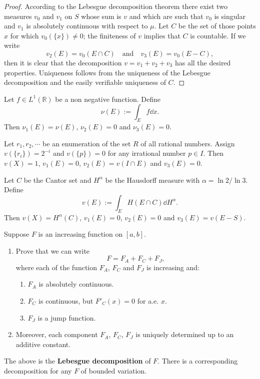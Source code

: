 \begin{proof}
  According to the Lebesgue decomposition theorem there exist two measures $v_0$ and $v_1$ on $S$ 
  whose sum is $v$ and which are such that $v_0$ is singular 
  and $v_1$ is absolutely continuous with respect to $\mu$.
  Let $C$ be the set of those points $x$ for which $v_0(\{x\}) \neq 0$; the finiteness of $v$ implies that 
  $C$ is countable. If we write 
  \[
  v_2(E) = v_0(E\cap C) \quad \text{and}\quad v_3(E) = v_0(E-C),
  \]
  then it is clear that the decomposition $v = v_1 + v_2 + v_3$ has all the desired properties.
  Uniqueness follows from the uniqueness of the Lebesgue decomposition 
  and the easily verifiable uniqueness of $C$.
\end{proof}

\begin{example}
  Let $f\in L^1(\mathbb R)$ be a non negative function. 
  Define 
  \[
  \nu(E) := \int_Ef\dd x.
  \]
  Then $\nu_1(E) = \nu(E)$, $\nu_2(E) = 0$ and $\nu_3(E) = 0$.

  Let $r_1, r_2, \cdots$ be an enumeration of the set $R$ of all rational numbers. 
  Assign $v(\{r_i\}) = 2^{-i}$ and $v(\{p\}) = 0$ for any irrational number $p\in I$.
  Then $v(X) = 1$, $v_1(E) = 0$, $v_2(E) = v(I\cap E)$ and $v_3(E) = 0$.

  Let $C$ be the Cantor set and $H^{\alpha}$ be the Hausdorff measure with $\alpha=\ln 2/\ln3$.
  Define 
  \[
  v(E) := \int_E H(E\cap C)\dd H^\alpha.
  \]
  Then $v(X) = H^\alpha(C)$, $v_1(E) = 0$, $v_2(E) = 0$ and $v_3(E) = v(E-S)$.
\end{example}

\begin{example}
  \label{eg: Lebesgue decomposition of increasing function}
  Suppose $F$ is an increasing function on $[a,b]$.
  \begin{enumerate}
    \item Prove that we can write 
    \[
    F = F_A + F_C + F_J,
    \]
    where each of the function $F_A$, $F_C$ and $F_J$ is increasing and:
    \begin{enumerate}
      \item $F_A$ is absolutely continuous.
      \item $F_C$ is continuous, but $F'_C(x) = 0$ for a.e. $x$.
      \item $F_J$ is a jump function.
    \end{enumerate}
    \item Moreover, each component $F_A$, $F_C$, $F_J$ is uniquely determined up to an additive constant.
  \end{enumerate}
  The above is the \textbf{Lebesgue decomposition} of $F$. There is a corresponding decomposition for any $F$ of bounded variation.
\end{example}

